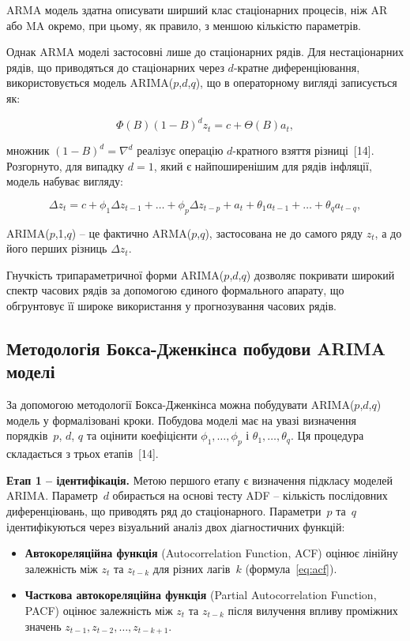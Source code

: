\documentclass{bachelor_thesis}
\begin{document}
ARMA модель здатна описувати ширший клас стаціонарних процесів, ніж AR або MA окремо, при цьому, як правило, з меншою кількістю параметрів.

Однак ARMA моделі застосовні лише до стаціонарних рядів. Для нестаціонарних рядів, що приводяться до стаціонарних через $d$-кратне диференціювання, використовується модель ARIMA($p$,$d$,$q$), що в операторному вигляді записується як:

\begin{equation}\label{eq:arima_model}
\Phi(B) (1 - B)^d z_t = c + \Theta(B) a_t,
\end{equation}

 множник $(1 - B)^d = \nabla^d$ реалізує операцію $d$-кратного взяття різниці~[14]. Розгорнуто, для випадку $d = 1$, який є найпоширенішим для рядів інфляції, модель набуває вигляду:

\begin{equation*}
\Delta z_t = c + \phi_1 \Delta z_{t-1} + \ldots + \phi_p \Delta z_{t-p} + a_t + \theta_1 a_{t-1} + \ldots + \theta_q a_{t-q},
\end{equation*}

 ARIMA($p$,1,$q$) -- це фактично ARMA($p$,$q$), застосована не до самого ряду $z_t$, а до його перших різниць $\Delta z_t$.

Гнучкість трипараметричної форми ARIMA($p$,$d$,$q$) дозволяє покривати широкий спектр часових рядів за допомогою єдиного формального апарату, що обгрунтовує її широке використання у прогнозування часових рядів.

\subsection{Методологія Бокса-Дженкінса побудови ARIMA моделі}

За допомогою методології Бокса-Дженкінса можна побудувати ARIMA($p$,$d$,$q$) модель у формалізовані кроки. Побудова моделі має на увазі визначення порядків~$p$, $d$, $q$ та оцінити коефіцієнти $\phi_1, \ldots, \phi_p$ і $\theta_1, \ldots, \theta_q$. Ця процедура складається з трьох етапів~[14].

\textbf{Етап 1 -- ідентифікація.} Метою першого етапу є визначення підкласу моделей ARIMA. Параметр~$d$ обирається на основі тесту ADF -- кількість послідовних диференціювань, що приводять ряд до стаціонарного. Параметри~$p$ та~$q$ ідентифікуються через візуальний аналіз двох діагностичних функцій:

\begin{itemize}
    \item \textbf{Автокореляційна функція} (Autocorrelation Function, ACF) оцінює лінійну залежність між $z_t$ та $z_{t-k}$ для різних лагів~$k$ (формула~\eqref{eq:acf}).
    \item \textbf{Часткова автокореляційна функція} (Partial Autocorrelation Function, PACF) оцінює залежність між $z_t$ та $z_{t-k}$ після вилучення впливу проміжних значень $z_{t-1}, z_{t-2}, \ldots, z_{t-k+1}$.
\end{itemize}
\end{document}
